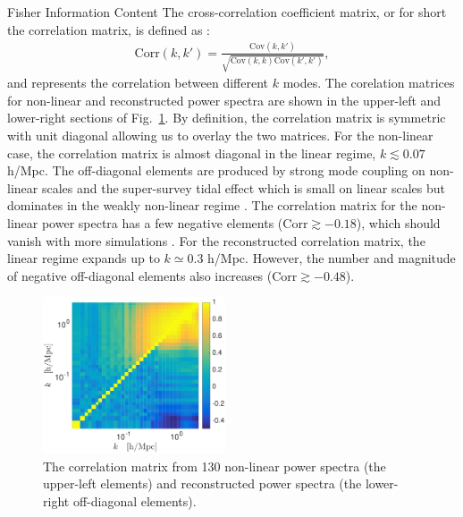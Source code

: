 \begin{section}{Fisher Information Content}
  The cross-correlation coefficient matrix, or for short the correlation matrix, 
  is defined as :
  \begin{align}
    \mathrm{Corr}\left(k,k'\right)=\frac{\mathrm{Cov}\left(k,k'\right)}
    {\sqrt{\mathrm{Cov}\left(k,k\right)\mathrm{Cov}\left(k',k'\right)}},
  \end{align}
  and represents the correlation between different $k$ modes.  The
  corelation matrices for non-linear and reconstructed power spectra
  are shown in the upper-left and lower-right sections of Fig.~\ref{fig:corrall}.
  By definition, the correlation matrix is symmetric with unit
  diagonal allowing us to overlay the two matrices.  For the
  non-linear case, the correlation matrix is almost diagonal in the linear
  regime, $k \lesssim 0.07$ h/Mpc.  The off-diagonal
  elements are produced by strong mode coupling on non-linear scales
  and the super-survey tidal effect which is small on linear scales
  but dominates in the weakly non-linear regime
  \cite{bib:Kazuyuki2016}.  The correlation matrix for the non-linear
  power spectra has a few negative elements
  ($\mathrm{Corr} \gtrsim -0.18$), which should vanish with more
  simulations \cite{bib:Takahashi2009}.  For the reconstructed
  correlation matrix, the linear regime expands up to $k \simeq 0.3$
  h/Mpc.  However, the number and magnitude of negative off-diagonal
  elements also increases ($\mathrm{Corr} \gtrsim -0.48$).

  \begin{figure}
    \centering
    \includegraphics[width=0.48\textwidth]{fig3.pdf}
    \caption{The correlation matrix from 130 non-linear power
      spectra (the upper-left elements) and reconstructed power
      spectra (the lower-right off-diagonal elements).}
    \label{fig:corrall}
  \end{figure}


\end{section}
